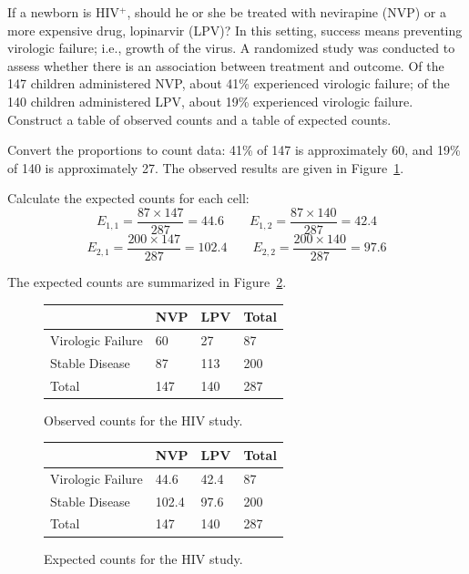 
\begin{examplewrap}
\begin{nexample}{If a newborn is HIV$^+$, should he or she be treated with nevirapine (NVP) or a more expensive drug, lopinarvir (LPV)? In this setting, success means preventing virologic failure; i.e., growth of the virus. A randomized study was conducted to assess whether there is an association between treatment and outcome.\footnotemark{} Of the 147 children administered NVP, about 41\% experienced virologic failure; of the 140 children administered LPV, about 19\% experienced virologic failure. Construct a table of observed counts and a table of expected counts.}

Convert the proportions to count data: 41\% of 147 is approximately 60, and 19\% of 140 is approximately 27. The observed results are given in Figure~\ref{violariHivStudyObsCounts}.

Calculate the expected counts for each cell:
\[E_{1, 1} = \dfrac{87 \times 147}{287} = 44.6 \qquad E_{1, 2} = \dfrac{87 \times 140}{287} = 42.4 \]
\[E_{2, 1} = \dfrac{200 \times 147}{287} = 102.4 \qquad E_{2, 2} = \dfrac{200 \times 140}{287} = 97.6 \]

The expected counts are summarized in Figure~\ref{violariHivStudyExpCounts}.
\end{nexample}
\end{examplewrap}

\begin{figure}[h]
	\centering
	\begin{tabular}{l | l l | l}
	\hline
	& NVP & LPV & Total \\
	\hline
	Virologic Failure & 60 & 27 & 87 \\
	Stable Disease & 87 & 113 & 200 \\
	\hline
	Total & 147 & 140 & 287 \\
	\hline
	\end{tabular}
	\caption{Observed counts for the HIV study.}
	\label{violariHivStudyObsCounts}
\end{figure}

\begin{figure}[h]
	\centering
	\begin{tabular}{l | l l | l}
		\hline
		& NVP & LPV & Total \\
		\hline
		Virologic Failure & 44.6 & 42.4 & 87 \\
		Stable Disease & 102.4 & 97.6 & 200 \\
		\hline
		Total & 147 & 140 & 287 \\
		\hline
	\end{tabular}
	\caption{Expected counts for the HIV study.}
	\label{violariHivStudyExpCounts}
\end{figure}

